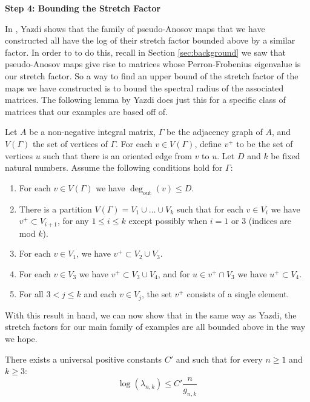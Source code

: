 \begin{center}
\textbf{Step 4: Bounding the Stretch Factor}
\end{center}

In \cite{yazdi2018pseudo}, Yazdi shows that the family of pseudo-Anosov maps that we have constructed all have the log of their stretch factor bounded above by a similar factor. In order to to do this, recall in Section \ref{sec:background} we saw that pseudo-Anosov maps give rise to matrices whose Perron-Frobenius eigenvalue is our stretch factor. So a way to find an upper bound of the stretch factor of the maps we have constructed is to bound the spectral radius of the associated matrices. The following lemma by Yazdi does just this for a specific class of matrices that our examples are based off of.

\begin{lem}[Yazdi]
\label{lem:spectral}
Let $A$ be a non-negative integral matrix, $\Gamma$ be the adjacency graph of $A$, and $V(\Gamma)$ the set of vertices of $\Gamma$. For each $v \in V(\Gamma)$, define $v^+$ to be the set of vertices $u$ such that there is an oriented edge from $v$ to $u$. Let $D$ and $k$ be fixed natural numbers. Assume the following conditions hold for $\Gamma$: \begin{enumerate}
    \item For each $v \in V(\Gamma)$ we have $\deg_{\text{out}}(v) \leq D$.
    \item There is a partition $V(\Gamma) = V_1 \cup \dots \cup V_k$ such that for each $v \in V_i$ we have $v^+ \subset V_{i+1}$, for any $1 \leq i \leq k$ except possibly when $i = 1$ or 3 (indices are mod $k$).
    \item For each $v \in V_1$, we have $v^+ \subset V_2 \cup V_3$.
    \item For each $v \in V_3$ we have $v^+ \subset V_3 \cup V_4$, and for $u \in v^+ \cap V_3$ we have $u^+ \subset V_4$.
    \item For all $3 < j \leq k$ and each $v \in V_j$, the set $v^+$ consists of a single element.
\end{enumerate}
\end{lem}

With this result in hand, we can now show that in the same way as Yazdi, the stretch factors for our main family of examples are all bounded above in the way we hope.

\begin{lem}
There exists a universal positive constants $C'$ and such that for every $n \geq 1$ and $k \geq 3$:
$$\log(\lambda_{n,k}) \leq C'\frac{n}{g_{n,k}}$$
\end{lem}

